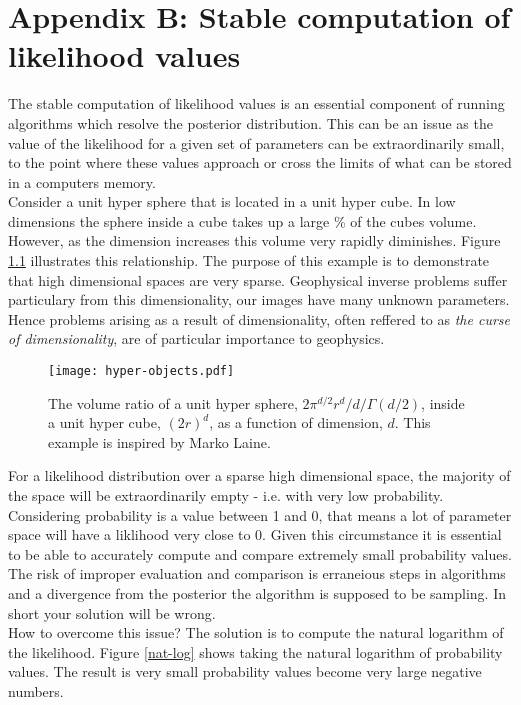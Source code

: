 \chapter{Appendix B: Stable computation of likelihood values}
\label{AppendixB}

The stable computation of likelihood values is an essential component of running algorithms which resolve the posterior distribution. This can be an issue as the value of the likelihood for a given set of parameters can be extraordinarily small, to the point where these values approach or cross the limits of what can be stored in a computers memory. \\

Consider a unit hyper sphere that is located in a unit hyper cube. In low dimensions the sphere inside a cube takes up a large \% of the cubes volume. However, as the dimension increases this volume very rapidly diminishes. Figure \ref{hyper-objects} illustrates this relationship. The purpose of this example is to demonstrate that high dimensional spaces are very sparse. Geophysical inverse problems suffer particulary from this dimensionality, our images have many unknown parameters. Hence problems arising as a result of dimensionality, often reffered to as \textit{the curse of dimensionality}, are of particular importance to geophysics. \\

\begin{figure}[H]
	\centering
	\texttt{[image: hyper-objects.pdf]}
	\caption{The volume ratio of a unit hyper sphere, $2\pi^{d/2}r^d/d/\Gamma(d/2)$, inside a unit hyper cube, $(2r)^d$, as a function of dimension, $d$. This example is inspired by Marko Laine.}
	\label{hyper-objects}
\end{figure}

For a likelihood distribution over a sparse high dimensional space, the majority of the space will be extraordinarily empty - i.e. with very low probability. Considering probability is a value between 1 and 0, that means a lot of parameter space will have a liklihood very close to 0. Given this circumstance it is essential to be able to accurately compute and compare extremely small probability values. The risk of improper evaluation and comparison is erraneious steps in algorithms and a divergence from the posterior the algorithm is supposed to be sampling. In short your solution will be wrong. \\

How to overcome this issue? The solution is to compute the natural logarithm of the likelihood. Figure \ref{nat-log} shows taking the natural logarithm of probability values. The result is very small probability values become very large negative numbers.

